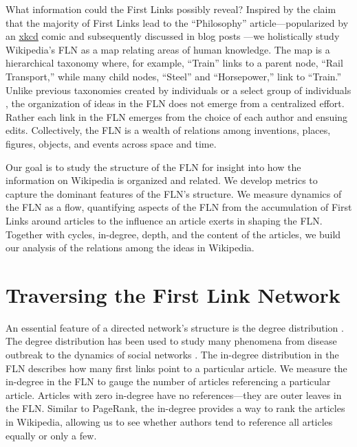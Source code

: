 \documentclass[pre,twocolumn,twoside,superscriptaddress,floatfix, aps, 10pt]{revtex4-1}
\begin{document}
What information could the First Links possibly reveal?
Inspired by the claim that the majority of First Links lead to the 
``Philosophy'' article---popularized by an 
\href{https://xkcd.com/903/}{xkcd}
comic and subsequently
discussed in blog posts 
\cite{mat_blog, Ilmari_first_links, xkcd}
---we holistically study 
Wikipedia's FLN as a map relating areas of human knowledge. 
The map is a hierarchical taxonomy where, for example, ``Train'' links to a parent node, 
``Rail Transport,'' while many child nodes, ``Steel'' and ``Horsepower,'' link to 
``Train.'' Unlike previous taxonomies
created by individuals
\cite{locke, descartes, aristotle}
or a select group of individuals 
\cite{hist_thesaurus}, 
the organization of ideas in the FLN 
does not emerge from a centralized effort. 
Rather each link in the FLN emerges from the choice of each author and ensuing edits.
Collectively, the FLN is a wealth of relations among inventions, places,
figures, objects, and events across space and time.


Our goal is to study the structure of the FLN for insight into how the information on Wikipedia is organized and related.
We develop metrics to capture 
the dominant features of the FLN's structure.
We measure dynamics of the FLN as a flow, quantifying 
aspects of the FLN from the accumulation of First Links around articles 
to the influence an article exerts in shaping the FLN.
Together with cycles, in-degree, depth, and the content of the articles, 
we build our analysis of the relations among the ideas in Wikipedia.



\section{Traversing the First Link Network}

An essential feature of a directed network's structure is the degree distribution 
\cite{newman}. 
The degree distribution has been used to study many phenomena from disease outbreak 
\cite{disease} 
to the dynamics of social networks 
\cite{social_nets}.
The in-degree distribution in the FLN describes how many first links point to a 
particular article. 
We measure the in-degree in the FLN to gauge the number of articles referencing a particular article.
Articles with zero in-degree have no references---they are outer leaves in the FLN. 
Similar to PageRank, the in-degree 
provides a way to rank the articles in Wikipedia, allowing us to see 
whether authors tend to reference all articles equally or only a few.
\end{document}
